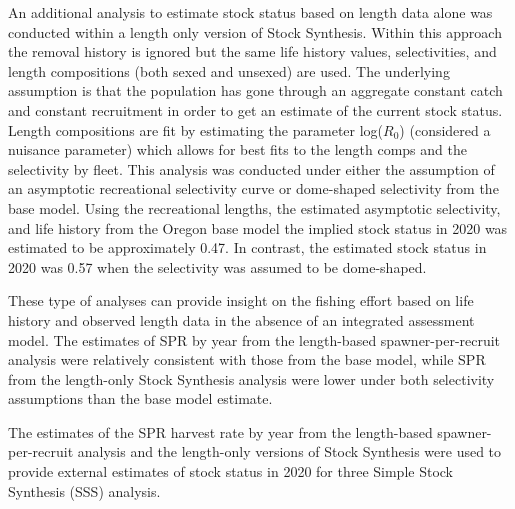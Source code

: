 \documentclass[11pt,
  english,
  a4paper,
]{article}
\begin{document}
\leavevmode\tagmcend\tagstructend\par


An additional analysis to estimate stock status based on length data alone was conducted within a length only version of Stock Synthesis. Within this approach the removal history is ignored but the same life history values, selectivities, and length compositions (both sexed and unsexed) are used. The underlying assumption is that the population has gone through an aggregate constant catch and constant recruitment in order to get an estimate of the current stock status. Length compositions are fit by estimating the parameter log({\(R_0\)\leavevmode\tagmcend\tagstructend}) (considered a nuisance parameter) which allows for best fits to the length comps and the selectivity by fleet. This analysis was conducted under either the assumption of an asymptotic recreational selectivity curve or dome-shaped selectivity from the base model. Using the recreational lengths, the estimated asymptotic selectivity, and life history from the Oregon base model the implied stock status in 2020 was estimated to be approximately 0.47. In contrast, the estimated stock status in 2020 was 0.57 when the selectivity was assumed to be dome-shaped.

\leavevmode\tagmcend\tagstructend\par


These type of analyses can provide insight on the fishing effort based on life history and observed length data in the absence of an integrated assessment model. The estimates of SPR by year from the length-based spawner-per-recruit analysis were relatively consistent with those from the base model, while SPR from the length-only Stock Synthesis analysis were lower under both selectivity assumptions than the base model estimate.

\leavevmode\tagmcend\tagstructend\par


The estimates of the SPR harvest rate by year from the length-based spawner-per-recruit analysis and the length-only versions of Stock Synthesis were used to provide external estimates of stock status in 2020 for three Simple Stock Synthesis (SSS) analysis.
\end{document}
